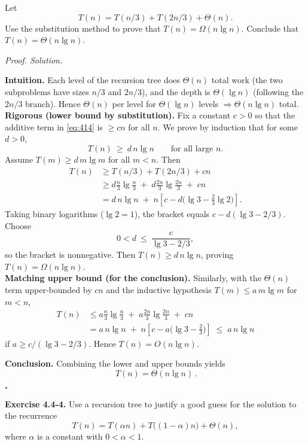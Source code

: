 \documentclass[12pt]{article}
\theoremstyle{definition}
\begin{document}
Let
\[
\tag{4.14}\label{eq:414}
T(n)=T(n/3)+T(2n/3)+\Theta(n).
\]
Use the substitution method to prove that $T(n)=\Omega(n\lg n)$. Conclude that $T(n)=\Theta(n\lg n)$.

\medskip
\noindent\textit{Proof. Solution.}

\noindent\textbf{Intuition.}
Each level of the recursion tree does $\Theta(n)$ total work (the two subproblems have
sizes $n/3$ and $2n/3$), and the depth is $\Theta(\lg n)$ (following the $2n/3$ branch).
Hence $\Theta(n)$ per level for $\Theta(\lg n)$ levels $\Rightarrow \Theta(n\lg n)$ total.\\

\noindent\textbf{Rigorous (lower bound by substitution).}
Fix a constant $c>0$ so that the additive term in \eqref{eq:414} is $\ge c n$ for all $n$.
We prove by induction that for some $d>0$,
\[
T(n)\ \ge\ d\,n\lg n \qquad\text{for all large } n.
\]
Assume $T(m)\ge d\,m\lg m$ for all $m<n$. Then
\[
\begin{aligned}
T(n)
&\ge T(n/3)+T(2n/3)+c n \\
&\ge d\frac{n}{3}\lg\!\frac{n}{3} \;+\; d\frac{2n}{3}\lg\!\frac{2n}{3} \;+\; c n \\
&= d\,n\lg n \;+\; n\!\left[c - d\Big(\lg 3 - \tfrac{2}{3}\lg 2\Big)\right].
\end{aligned}
\]
Taking binary logarithms ($\lg 2=1$), the bracket equals $c - d(\lg 3 - 2/3)$.
Choose
\[
0<d\ \le\ \frac{c}{\lg 3 - 2/3},
\]
so the bracket is nonnegative. Then $T(n)\ge d\,n\lg n$, proving $T(n)=\Omega(n\lg n)$.\\

\noindent\textbf{Matching upper bound (for the conclusion).}
Similarly, with the $\Theta(n)$ term upper-bounded by $c n$ and the inductive hypothesis
$T(m)\le a\,m\lg m$ for $m<n$,
\[
\begin{aligned}
T(n)
&\le a\frac{n}{3}\lg\!\frac{n}{3} \;+\; a\frac{2n}{3}\lg\!\frac{2n}{3} \;+\; c n \\
&= a\,n\lg n \;+\; n\!\left[c - a\Big(\lg 3 - \tfrac{2}{3}\Big)\right]
\;\le\; a\,n\lg n
\end{aligned}
\]
if $a\ge c/(\lg 3 - 2/3)$. Hence $T(n)=O(n\lg n)$.

\textbf{Conclusion.}
Combining the lower and upper bounds yields
\[
\boxed{\,T(n)=\Theta(n\lg n)\,}.
\]

\hfill$\square$

\newpage

\noindent\textbf{Exercise 4.4-4.}
Use a recursion tree to justify a good guess for the solution to the recurrence
\[
T(n)=T(\alpha n)+T\!\big((1-\alpha)n\big)+\Theta(n),
\]
where $\alpha$ is a constant with $0<\alpha<1$.
\end{document}
